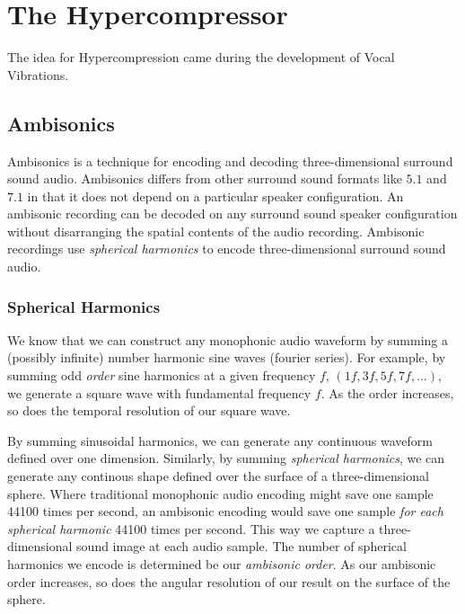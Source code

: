 \chapter{The Hypercompressor}
\label{ch:hypercompressor}

The idea for Hypercompression came during the development of Vocal
Vibrations.\cite{Holbrow2014}

\section{Ambisonics}
\label{sec:ambisonics}
Ambisonics is a technique for encoding and decoding three-dimensional
surround sound audio.\cite{Gerzon1985} Ambisonics differs from other
surround sound formats like $5.1$ and $7.1$ in that it does not depend
on a particular speaker configuration. An ambisonic recording can be
decoded on any surround sound speaker configuration without
disarranging the spatial contents of the audio recording. Ambisonic recordings
use \textit{spherical harmonics} to encode three-dimensional surround
sound audio.

\subsection{Spherical Harmonics}
\label{sec:spherical-harmonics}
We know that we can construct any monophonic audio waveform by summing
a (possibly infinite) number harmonic sine waves (fourier
series).
For example, by summing odd \textit{order} sine harmonics at a given
frequency $f$, $(1f, 3f, 5f, 7f, \ldots )$, we generate a square wave with
fundamental frequency $f$. As the order increases, so does the
temporal resolution of our square wave.

By summing sinusoidal harmonics, we can generate any continuous
waveform defined over one dimension. Similarly, by summing
\emph{spherical harmonics}, we can generate any continous shape
defined over the surface of a three-dimensional sphere. Where
traditional monophonic audio encoding might save one sample 44100
times per second, an ambisonic encoding would save one sample
\emph{for each spherical harmonic} 44100 times per second. This way we
capture a three-dimensional sound image at each audio sample.  The
number of spherical harmonics we encode is determined be our
\textit{ambisonic order}. As our ambisonic order increases, so does
the angular resolution of our result on the surface of the sphere.

